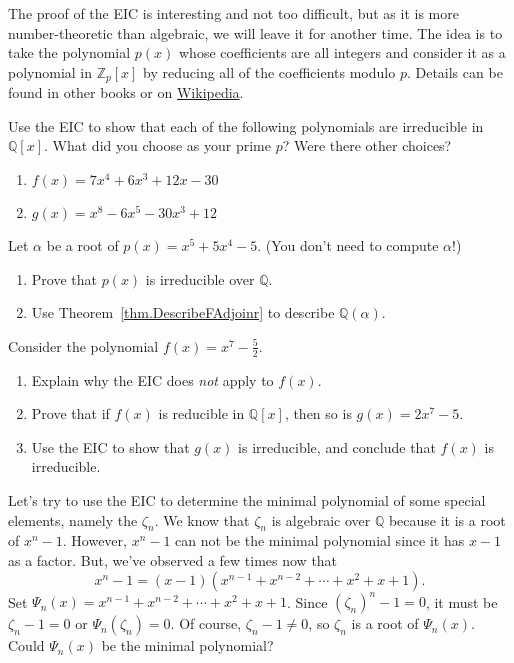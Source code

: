 The proof of the EIC is  interesting and not too difficult, but as it is more  number-theoretic than algebraic, we will leave it for another time.  The idea is to take the polynomial $p(x)$ whose coefficients are all integers and consider it as a polynomial in $\mathbb{Z}_p[x]$ by reducing all of the coefficients modulo $p$.
Details can be found in other books or on \href{https://en.wikipedia.org/wiki/Eisenstein\%27s_criterion}{Wikipedia}. 

\begin{problem}
Use the EIC to show that each of the following polynomials are irreducible in $\mathbb{Q}[x]$. What did you choose as your prime $p$? Were there other choices?
\begin{enumerate}
\item  $f(x) = 7x^{4}+6x^3 + 12x-30$
\item  $g(x) = x^{8}-6x^5 -30x^3 + 12$
\end{enumerate}
\end{problem}

\begin{problem}\label{prob.DescribeQRootx55x45}
Let $\alpha$ be a root of $p(x) = x^5 + 5x^4 - 5$. (You don't need to compute $\alpha$!)
\begin{enumerate}
\item Prove that $p(x)$ is irreducible over $\mathbb{Q}$.
\item Use Theorem~\ref{thm.DescribeFAdjoinr} to describe $\mathbb{Q}(\alpha)$.
\end{enumerate}
\end{problem}

\begin{problem}
Consider the polynomial $f(x) = x^7 - \frac{5}{2}$.
\begin{enumerate}
\item Explain why the EIC does \emph{not} apply to $f(x)$.
\item Prove that if $f(x)$ is reducible in $\mathbb{Q}[x]$, then so is $g(x) = 2x^7 - 5$.
\item Use the EIC to show that $g(x)$ is irreducible, and conclude that $f(x)$ is irreducible.
\end{enumerate}
\end{problem}

Let's try to use the EIC to determine the minimal polynomial of some special elements, namely the $\zeta_n$. We know that $\zeta_n$ is algebraic over $\mathbb{Q}$ because it is a root of $x^n-1$. However, $x^n-1$ can not be the minimal polynomial since it has $x-1$ as a factor. But, we've observed a few times now that \[x^n-1 = (x-1)(x^{n-1} + x^{n-2} + \cdots + x^2 + x + 1).\]
Set $\Psi_n(x) =  x^{n-1} + x^{n-2} + \cdots + x^2 + x + 1$. Since $(\zeta_n)^n-1 = 0$, it must be $\zeta_n-1 = 0$ or $\Psi_n(\zeta_n) = 0$. Of course, $\zeta_n-1 \neq 0$, so $\zeta_n$ is a root of $\Psi_n(x)$. Could $\Psi_n(x)$ be the minimal polynomial?

